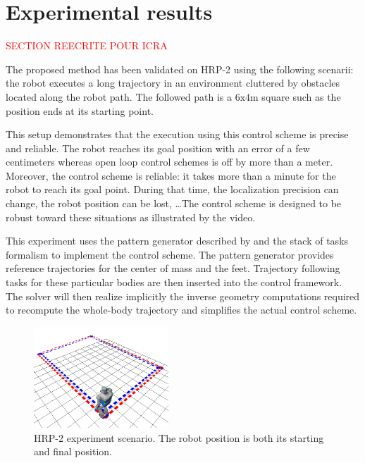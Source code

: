 \section{Experimental results}
\label{exp}


\textcolor{red}{SECTION REECRITE POUR ICRA}


The proposed method has been validated on HRP-2 using the following
scenarii: the robot executes a long trajectory in an environment
cluttered by obstacles located along the robot path. The followed path
is a $6\text{x}4 \mathrm{m}$ square such as the position ends at its
starting point.

This setup demonstrates that the execution using this control scheme
is precise and reliable. The robot reaches its goal position with an
error of a few centimeters whereas open loop control schemes is off by
more than a meter. Moreover, the control scheme is reliable: it takes
more than a minute for the robot to reach its goal point. During that
time, the localization precision can change, the robot position can be
lost, \ldots The control scheme is designed to be robust toward these
situations as illustrated by the video.


This experiment uses the pattern generator described by
\cite{10icra.perrin} and the stack of tasks formalism
\cite{09icar.mansard} to implement the control scheme. The pattern
generator provides reference trajectories for the center of mass and
the feet. Trajectory following tasks for these particular bodies are
then inserted into the control framework. The solver will then realize
implicitly the inverse geometry computations required to recompute the
whole-body trajectory and simplifies the actual control scheme.


\begin{figure}[ht!]
  \begin{center}
    \includegraphics[width=0.45\textwidth]{fig/demo.png}
  \end{center}
  \caption{HRP-2 experiment scenario. The robot position is both
    its starting and final position. \label{fig:scenario}}
\end{figure}


